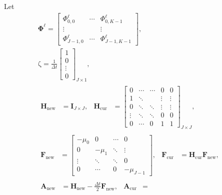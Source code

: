 \documentclass[USenglish]{article}
\renewcommand{\vec}[1]{\boldsymbol{\mathrm{#1}}}
\newcommand{\mat}[1]{\mathbf{#1}}
\begin{document}
Let
\begin{subequations}
  \begin{gather}
    \mat{\Phi}^{\ell}
    =
    \begin{bmatrix}
      \Phi_{0, 0}^{\ell} & \cdots & \Phi_{0, K - 1}^{\ell} \\
      \vdots & & \vdots \\
      \Phi_{J - 1, 0}^{\ell} & \cdots & \Phi_{J - 1, K - 1}^{\ell}
    \end{bmatrix},
    \\
    \vec{\zeta} =
    \frac{1}{\Delta t}
    \begin{bmatrix}
      1 \\ 0 \\ \vdots \\ 0
    \end{bmatrix}_{J \times 1},
    \\
    \begin{aligned}
      \mat{H}_{\mathrm{new}} &= \mat{I}_{J \times J},
      &
      \mat{H}_{\mathrm{cur}} &=
      \begin{bmatrix}
        0 & \cdots & \cdots & 0 & 0
        \\
        1 & \ddots & & \vdots & \vdots
        \\
        0 & \ddots & \ddots & \vdots & \vdots
        \\
        \vdots & \ddots & \ddots & 0 & 0
        \\
        0 & \cdots & 0 & 1 & 1
      \end{bmatrix}_{J \times J},
    \end{aligned}
    \\
    \begin{aligned}
      \mat{F}_{\mathrm{new}} &=
      \begin{bmatrix}
        - \mu_0 & 0 & \cdots & 0
        \\
        0 & - \mu_1 & \ddots & \vdots
        \\
        \vdots & \ddots & \ddots & 0
        \\
        0 & \cdots & 0 & - \mu_{J - 1}
      \end{bmatrix},
      &
      \mat{F}_{\mathrm{cur}} &=
      \mat{H}_{\mathrm{cur}} \mat{F}_{\mathrm{new}},
    \end{aligned}
    \\
    \begin{aligned}
      \mat{A}_{\mathrm{new}} &=
      \mat{H}_{\mathrm{new}} - \frac{\Delta t}{2} \mat{F}_{\mathrm{new}},
      &
      \mat{A}_{\mathrm{cur}} &=

\end{aligned}
\end{gather}
\end{subequations}
\end{document}

